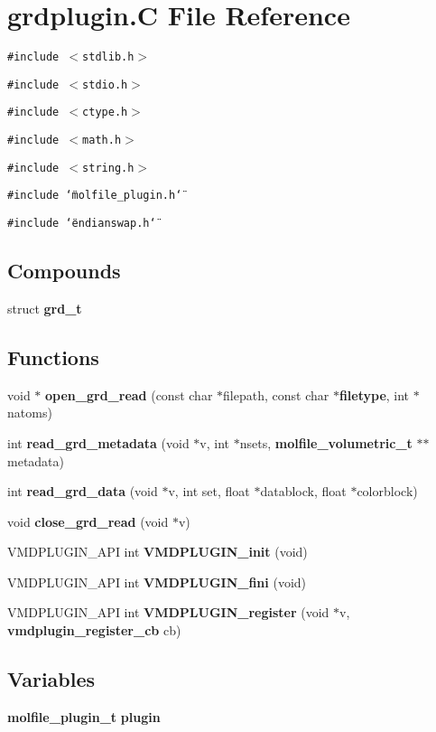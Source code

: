 \section{grdplugin.C File Reference}
\label{grdplugin_8C}
{\tt \#include $<$stdlib.h$>$}\par
{\tt \#include $<$stdio.h$>$}\par
{\tt \#include $<$ctype.h$>$}\par
{\tt \#include $<$math.h$>$}\par
{\tt \#include $<$string.h$>$}\par
{\tt \#include \char`\"{}molfile\_\-plugin.h\char`\"{}}\par
{\tt \#include \char`\"{}endianswap.h\char`\"{}}\par
\subsection*{Compounds}
\begin{CompactItemize}
\item 
struct {\bf grd\_\-t}
\end{CompactItemize}
\subsection*{Functions}
\begin{CompactItemize}
\item 
void $\ast$ {\bf open\_\-grd\_\-read} (const char $\ast$filepath, const char $\ast${\bf filetype}, int $\ast$natoms)
\item 
int {\bf read\_\-grd\_\-metadata} (void $\ast$v, int $\ast$nsets, {\bf molfile\_\-volumetric\_\-t} $\ast$$\ast$metadata)
\item 
int {\bf read\_\-grd\_\-data} (void $\ast$v, int set, float $\ast$datablock, float $\ast$colorblock)
\item 
void {\bf close\_\-grd\_\-read} (void $\ast$v)
\item 
VMDPLUGIN\_\-API int {\bf VMDPLUGIN\_\-init} (void)
\item 
VMDPLUGIN\_\-API int {\bf VMDPLUGIN\_\-fini} (void)
\item 
VMDPLUGIN\_\-API int {\bf VMDPLUGIN\_\-register} (void $\ast$v, {\bf vmdplugin\_\-register\_\-cb} cb)
\end{CompactItemize}
\subsection*{Variables}
\begin{CompactItemize}
\item 
{\bf molfile\_\-plugin\_\-t} {\bf plugin}
\end{CompactItemize}


